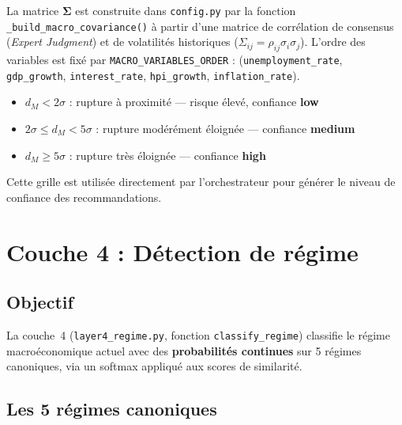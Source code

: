 \documentclass[12pt,a4paper]{article}
\begin{document}
La matrice $\boldsymbol{\Sigma}$ est construite dans \texttt{config.py} par la fonction
\texttt{\_build\_macro\_covariance()} \`a partir d'une matrice de corr\'elation de consensus
(\textit{Expert Judgment}) et de volatilit\'es historiques ($\Sigma_{ij} = \rho_{ij} \sigma_i \sigma_j$).
L'ordre des variables est fix\'e par \texttt{MACRO\_VARIABLES\_ORDER} :
(\texttt{unemployment\_rate}, \texttt{gdp\_growth}, \texttt{interest\_rate},
\texttt{hpi\_growth}, \texttt{inflation\_rate}).

\begin{interpretbox}
\begin{itemize}[nosep]
    \item $d_M < 2\sigma$ : rupture \`a proximit\'e --- risque \'elev\'e, confiance \textbf{low}
    \item $2\sigma \leq d_M < 5\sigma$ : rupture mod\'er\'ement \'eloign\'ee --- confiance \textbf{medium}
    \item $d_M \geq 5\sigma$ : rupture tr\`es \'eloign\'ee --- confiance \textbf{high}
\end{itemize}
Cette grille est utilis\'ee directement par l'orchestrateur pour g\'en\'erer le
niveau de confiance des recommandations.
\end{interpretbox}


\newpage
\section{Couche 4 : D\'etection de r\'egime}

\subsection{Objectif}

La couche~4 (\texttt{layer4\_regime.py}, fonction \texttt{classify\_regime})
classifie le r\'egime macro\-\'economique actuel avec des \textbf{probabilit\'es continues}
sur 5 r\'egimes canoniques, via un softmax appliqu\'e aux scores de similarit\'e.

\subsection{Les 5 r\'egimes canoniques}
\end{document}
